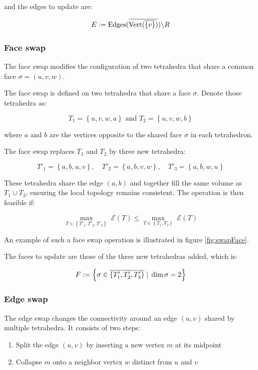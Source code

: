 \documentclass[11pt]{article}
\begin{document}
and the edges to update are:

$$E := \mathrm{Edges}(\overline{\mathrm{Vert}(\overline{\left\{v\right\}})}) \backslash R$$



\subsubsection{Face swap}\label{sec:faceSwap}



The face swap modifies the configuration of two tetrahedra that share a common face $\sigma = (u,v,w)$.

The face swap is defined on two tetrahedra that share a face $\sigma$. Denote those tetrahedra as:

$$T_1 = \left\{u, v, w, a\right\} \text{ and } T_2 = \left\{u, v, w, b\right\}$$

where $a$ and $b$ are the vertices opposite to the shared face $\sigma$ in each tetrahedron.

The face swap replaces $T_1$ and $T_2$ by three new tetrahedra:

$$T'_1 = \left\{a, b, u, v\right\}, \quad T'_2 = \left\{a, b, v, w\right\}, \quad T'_3 = \left\{a, b, w,
	u\right\}$$

These tetrahedra share the edge $(a,b)$ and together fill the same volume as $T_1 \cup T_2$, ensuring the
local topology remains consistent. The operation is then feasible if:

$$\underset{T\in\left\{T'_1,T'_2,T'_3\right\}}{\max}\;\mathcal{E}(T)\leq\underset{T\in\left\{T_1,T_2\right\}}{\max}\;\mathcal{E}(T)$$

An example of such a face swap operation is illustrated in figure \ref{fig:swapFace}.

The faces to update are those of the three new tetrahedras added, which is:

$$F := \left\{\sigma\in\overline{\left\{T'_1,T'_2,T'_3\right\}}\;|\; \dim \sigma = 2\right\}$$


\subsubsection{Edge swap}\label{sec:edgeSwap}



The edge swap changes the connectivity around an edge $(u,v)$ shared by multiple tetrahedra. It consists of two steps:

\begin{enumerate}
	\item Split the edge $(u,v)$ by inserting a new vertex $m$ at its midpoint
	\item Collapse $m$ onto a neighbor vertex $w$ distinct from $u$ and $v$
\end{enumerate}
\end{document}
